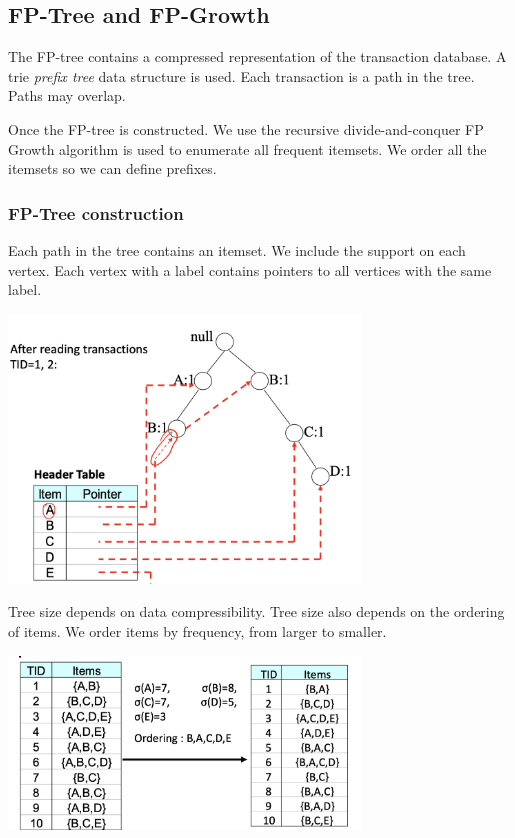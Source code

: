    \subsection{FP-Tree and FP-Growth}
        The FP-tree contains a compressed representation of the transaction database. A trie \emph{prefix tree} data structure is used. Each transaction is a path in the tree. Paths may overlap.
        
        Once the FP-tree is constructed. We use the recursive divide-and-conquer FP Growth algorithm is used to enumerate all frequent itemsets. We order all the itemsets so we can define prefixes.
        
    \subsubsection{FP-Tree construction}
        Each path in the tree contains an itemset. We include the support on each vertex. Each vertex with a label contains pointers to all vertices with the same label. 
        
        \begin{center}
            \includegraphics[width=0.7\textwidth]{images/fpconstruction.png}
        \end{center}
        
        Tree size depends on data compressibility. Tree size also depends on the ordering of items. We order items by frequency, from larger to smaller. 
        
           \begin{center}
            \includegraphics[width=0.7\textwidth]{images/ordering.png}
        \end{center}
        
